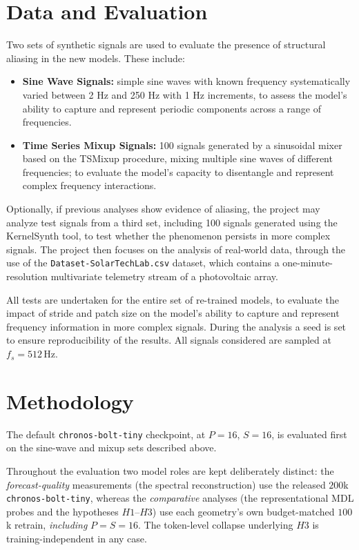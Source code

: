 \section{Data and Evaluation}
Two sets of synthetic signals are used to evaluate the presence of structural aliasing in the new models. These include:
\begin{itemize}
    \item \textbf{Sine Wave Signals:} simple sine waves with known frequency systematically varied between 2 Hz and 250 Hz with 1 Hz increments, to assess the model's ability to capture and represent periodic components across a range of frequencies.
    \item \textbf{Time Series Mixup Signals:} 100 signals generated by a sinusoidal mixer based on the TSMixup procedure\cite{ansariChronosLearningLanguage2024}, mixing multiple sine waves of different frequencies; to evaluate the model's capacity to disentangle and represent complex frequency interactions.
\end{itemize}

Optionally, if previous analyses show evidence of aliasing, the project may analyze test signals from a third set, including 100 signals generated using the KernelSynth\cite{ansariChronosLearningLanguage2024} tool, to test whether the phenomenon persists in more complex signals. The project then focuses on the analysis of real-world data, through the use of the \texttt{Dataset-SolarTechLab.csv} dataset, which contains a one-minute-resolution multivariate telemetry stream of a photovoltaic array\cite{levaPhotovoltaicPowerWeather2020}.

All tests are undertaken for the entire set of re-trained models, to evaluate the impact of stride and patch size on the model's ability to capture and represent frequency information in more complex signals. During the analysis a seed is set to ensure reproducibility of the results. All signals considered are sampled at $f_s = 512$\,Hz.

\section{Methodology}


The default \texttt{chronos-bolt-tiny} checkpoint, at $P{=}16,\,S{=}16$, is evaluated first on the sine-wave and mixup sets described above.

Throughout the evaluation two model roles are kept deliberately distinct: the \emph{forecast-quality} measurements (the spectral reconstruction) use the released $200$k \texttt{chronos-bolt-tiny}, whereas the \emph{comparative} analyses (the representational MDL probes and the hypotheses $H1$--$H3$) use each geometry's own budget-matched $100$k retrain, \emph{including} $P{=}S{=}16$. The token-level collapse underlying $H3$ is training-independent in any case.

